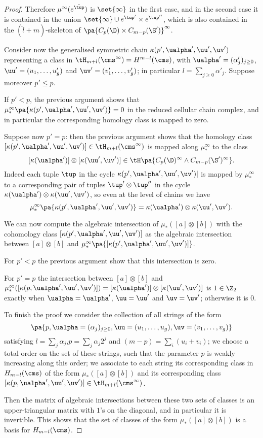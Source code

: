 \begin{proof}
Therefore
$\mu^{\infty}(e^{\tilde{\tup}})$ is $\set{\infty}$ in the first case, and in the second case it
is contained in the union $\set{\infty}\cup e^{\tup'}\times e^{\tup''}$, which is also
contained in the $(\tilde{l}+m)$-skeleton of $\pa{C_p(\D)\times C_{m-p}(\S')}^{\infty}$.

Consider now the generalised symmetric chain $\kappa(p',\ualpha',\uu',\uv')$ representing
a class in $\tH_{m+l}(\cms^{\infty})=H^{m-l}(\cms)$, with $\ualpha'=(\alpha'_j)_{j\geq 0}$,
$\uu'=(u_1,\dots,u'_g)$ and $\uv'=(v'_1,\dots,v'_g)$; in particular $l=\sum_{j\geq 0}\alpha'_j$.
Suppose moreover $p'\leq p$.

If $p'<p$, the previous argument shows that $\mu^{\infty}_*\pa{\kappa(p',\ualpha',\uu',\uv')}=0$
in the reduced cellular chain complex,
and in particular the corresponding homology class is mapped to zero.

Suppose now $p'=p$: then the previous argument shows that
the homology class $[\kappa(p',\ualpha',\uu',\uv')]\in \tH_{m+l}(\cms^{\infty})$
is mapped along $\mu^{\infty}_*$ to the class
\[
[\kappa(\ualpha')]\otimes [\kappa(\uu',\uv')]\in\tH\pa{C_p(\D)^{\infty}\wedge C_{m-p}(\S')^{\infty}}.
\]
Indeed each tuple $\tup$ in the cycle $\kappa(p',\ualpha',\uu',\uv')|$ is mapped by $\mu^{\infty}_*$
to a corresponding pair of tuples $\tup'\otimes\tup''$ in the cycle $\kappa(\ualpha')\otimes \kappa(\uu',\uv')$,
so even at the level of chains we have
\[
\mu^{\infty}_*\pa{\kappa(p',\ualpha',\uu',\uv')}=\kappa(\ualpha')\otimes \kappa(\uu',\uv').
\]

We can now compute the algebraic intersection of $\mu_*([a]\otimes [b])$ with
the cohomology class $[\kappa(p',\ualpha',\uu',\uv')]$ as the algebraic intersection between
$[a]\otimes [b]$ and $\mu^{\infty}_*\pa{[\kappa(p',\ualpha',\uu',\uv')]}$.

For $p'<p$ the previous argument show that this intersection is zero.

For $p'=p$ the intersection between
$[a]\otimes [b]$ and $\mu^{\infty}_*([\kappa(p,\ualpha',\uu',\uv')])=[\kappa(\ualpha')]\otimes [\kappa(\uu',\uv')]$
is $1\in\Z_2$ exactly when $\ualpha=\ualpha'$, $\uu=\uu'$ and $\uv=\uv'$; otherwise it is $0$.

To finish the proof we consider the collection of all strings of the form
\[
\pa{p,\ualpha=(\alpha_j)_{j\geq 0},\uu=(u_1,\dots,u_g),\uv=(v_1,\dots,v_g)}
\]
satisfying $l=\sum_j\alpha_j$,$p=\sum_j \alpha_j2^j$ and $(m-p)=\sum_i(u_i+v_i)$;
we choose a total order on the set of these strings,
such that the parameter $p$ is weakly increasing along this order; we associate
to each string its corresponding class in $H_{m-l}(\cms)$ of the form $\mu_*([a]\otimes [b])$ and its
corresponding class $[\kappa(p,\ualpha',\uu',\uv')]\in\tH_{m+l}(\cms^{\infty})$.

Then the matrix of algebraic intersections between these two sets of
classes is an upper-triangular matrix
with $1$'s on the diagonal, and in particular
it is invertible. This shows that the set of classes of the form $\mu_*([a]\otimes [b])$
is a basis for $H_{m-l}(\cms)$.
\end{proof}

